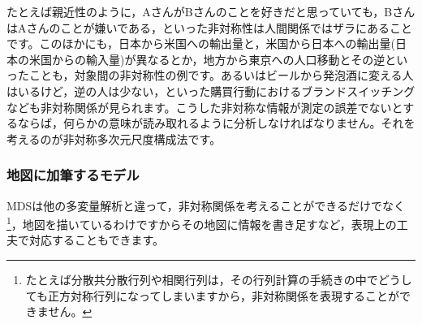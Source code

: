 \documentclass{ltjsbook}
\begin{document}
たとえば親近性のように，AさんがBさんのことを好きだと思っていても，BさんはAさんのことが嫌いである，といった非対称性は人間関係ではザラにあることです。このほかにも，日本から米国への輸出量と，米国から日本への輸出量(日本の米国からの輸入量)が異なるとか，地方から東京への人口移動とその逆といったことも，対象間の非対称性の例です。あるいはビールから発泡酒に変える人はいるけど，逆の人は少ない，といった購買行動におけるブランドスイッチングなども非対称関係が見られます。こうした非対称な情報が測定の誤差でないとするならば，何らかの意味が読み取れるように分析しなければなりません。それを考えるのが非対称多次元尺度構成法です。

\subsubsection{地図に加筆するモデル}
MDSは他の多変量解析と違って，非対称関係を考えることができるだけでなく\footnote{たとえば分散共分散行列や相関行列は，その行列計算の手続きの中でどうしても正方対称行列になってしまいますから，非対称関係を表現することができません。}，地図を描いているわけですからその地図に情報を書き足すなど，表現上の工夫で対応することもできます。
\end{document}
